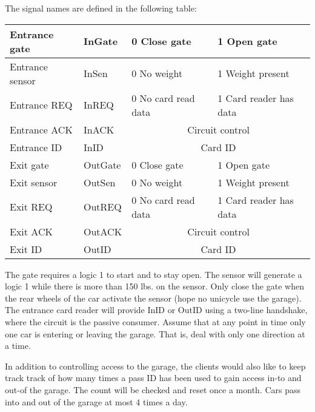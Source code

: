 \begin{enumerate}
        The signal names are defined in the following table:

        \begin{tabular}{|l|l||l|l|} \hline
            Entrance gate    & InGate    & 0 Close gate & 1 Open gate \\ \hline
            Entrance sensor    & InSen        & 0 No weight &  1 Weight present \\ \hline
            Entrance REQ    & InREQ        & 0 No card read data & 1 Card reader has data  \\ \hline
            Entrance ACK    & InACK        & \multicolumn{2}{c|}{Circuit control}   \\ \hline
            Entrance ID    & InID        & \multicolumn{2}{c|}{Card ID} \\ \hline
            Exit gate    & OutGate    & 0 Close gate &  1 Open gate \\ \hline
            Exit sensor    & OutSen    & 0 No weight & 1 Weight present\\ \hline
            Exit REQ    & OutREQ    & 0 No card read data & 1 Card reader has data  \\ \hline
            Exit ACK    & OutACK    & \multicolumn{2}{c|}{Circuit control}   \\ \hline
            Exit ID        & OutID        & \multicolumn{2}{c|}{Card ID} \\ \hline
        \end{tabular}

        The gate requires a logic 1 to start and to stay open. The sensor will
        generate a logic 1 while there is more than 150 lbs. on the sensor.  Only
        close the gate when the rear wheels of the car activate the
        sensor (hope no unicycle use the garage).  The entrance card reader
        will provide InID or OutID using a
        two-line handshake, where the circuit is the passive consumer.
        Assume that at any point in time only one car is
        entering or leaving the garage.  That is, deal with only
        one direction at a time.

        In addition to controlling access to the garage, the clients would also
        like to keep track track of how many times a pass ID has been used to
        gain access in-to and out-of the garage.  The count will be checked and
        reset once a month.  Cars pass into and out of the garage at most 4
        times a day.


\end{enumerate}
